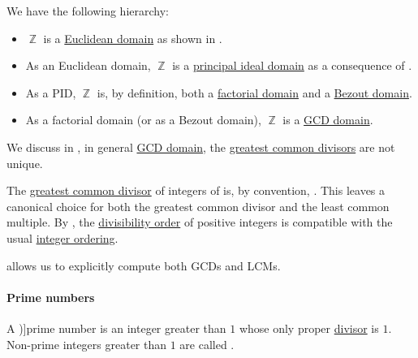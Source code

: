 \begin{remark}\label{rem:integer_domain_chain}\hfill
  We have the following hierarchy:
  \begin{itemize}
    \item \( \BbbZ \) is a \hyperref[def:euclidean_domain]{Euclidean domain} as shown in .
    \item As an Euclidean domain, \( \BbbZ \) is a \hyperref[def:principal_ideal_domain]{principal ideal domain} as a consequence of .
    \item As a PID, \( \BbbZ \) is, by definition, both a \hyperref[def:factorial_domain]{factorial domain} and a \hyperref[def:bezout_domain]{Bezout domain}.
    \item As a factorial domain (or as a Bezout domain), \( \BbbZ \) is a \hyperref[def:gcd_domain]{GCD domain}.
  \end{itemize}
\end{remark}

\begin{remark}\label{rem:integer_gcd}
  We discuss in , in general \hyperref[def:gcd_domain]{GCD domain}, the \hyperref[def:gcd]{greatest common divisors} are not unique.

  The \hyperref[def:gcd]{greatest common divisor} of integers of is, by convention, . This leaves a canonical choice for both the greatest common divisor and the least common multiple. By , the \hyperref[thm:semiring_divisibility_order]{divisibility order} of positive integers is compatible with the usual \hyperref[def:integer_ordering]{integer ordering}.

   allows us to explicitly compute both GCDs and LCMs.
\end{remark}

\paragraph{Prime numbers}

\begin{definition}\label{def:prime_number}
  A \term[ru=простое число (\cite[45]{Зорич2019Том1})]{prime number} is an integer greater than \( 1 \) whose only proper \hyperref[def:divisibility]{divisor} is \( 1 \). Non-prime integers greater than \( 1 \) are called .
\end{definition}


